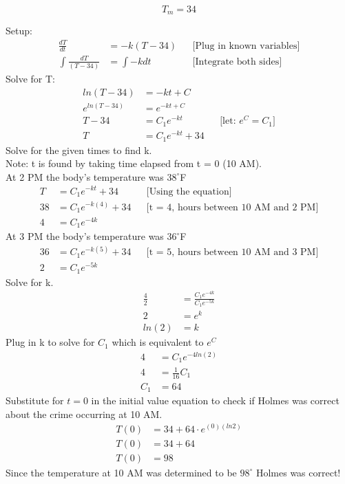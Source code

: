 \documentclass{article}
\begin{document}
\begin{flushleft}
{\[ T_m = 34 \]

Setup:
\begin{align*}
\frac{dT}{dt} & = -k(T-34) && \text{[Plug in known variables]}\\
\int \frac{dT}{(T-34)} & = \int -kdt && \text{[Integrate both sides]}
\end{align*}
\bigskip
Solve for T:\\
\begin{align*}
ln(T - 34) & =  -kt + C \\
e^{ln(T - 34)} & = e^{-kt + C} \\
T - 34 & = C_1e^{-kt} && \text{[let: $e^C = C_1$]}\\
T & = C_1e^{-kt} +34
\end{align*}
Solve for the given times to find k. \\
Note: t is found by taking time elapsed from t = 0 (10 AM).\\
At 2 PM the body's temperature was $38^{\circ}$F\\
\begin{align*}
T & = C_1e^{-kt} + 34 && \text{[Using the equation]} \\
38 & = C_1e^{-k(4)} + 34 && \text{[t = 4, hours between 10 AM and  2 PM]} \\
4 & = C_1e^{-4k}
\end{align*}
At 3 PM the body's temperature was $36^{\circ}$F\\
\begin{align*}
36 & = C_1e^{-k(5)} + 34 && \text{[t = 5, hours between 10 AM and  3 PM]} \\
2 & = C_1e^{-5k}
\end{align*}
Solve for k.\\
\begin{align*}
\frac{4}{2} & = \frac{C_1e^{-4k}}{C_1e^{-5k}}\\
2 & = e^k\\
ln(2) & = k
\end{align*}
Plug in k to solve for $C_1$ which is equivalent to $e^C$
\begin{align*}
4 & = C_1e^{-4ln(2)} \\
4 & = \frac{1}{16}C_1 \\
C_1 & = 64 
\end{align*}
Substitute for $t = 0$ in the initial value equation to check if Holmes was correct about the crime occurring at 10 AM.
\begin{align*}
T(0) & = 34 + 64 \cdot e^{(0)(ln2)}\\
T(0) & = 34 + 64\\
T(0) & = 98 
\end{align*}
\bigskip
Since the temperature at 10 AM was determined to be $98^{\circ}$ Holmes was correct!\\

}
\end{flushleft}
\end{document}

